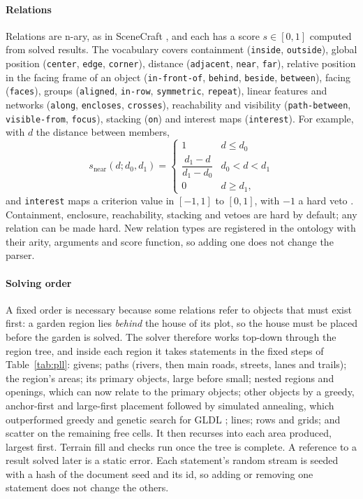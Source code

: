 \documentclass[conference]{IEEEtran}
\begin{document}
\paragraph{Relations} Relations are n-ary, as in SceneCraft \cite{scenecraft}, and each
has a score $s \in [0,1]$ computed from solved results. The vocabulary covers
containment (\texttt{inside}, \texttt{outside}), global position (\texttt{center},
\texttt{edge}, \texttt{corner}), distance (\texttt{adjacent}, \texttt{near},
\texttt{far}), relative position in the facing frame of an object
(\texttt{in-front-of}, \texttt{behind}, \texttt{beside}, \texttt{between}), facing
(\texttt{faces}), groups (\texttt{aligned}, \texttt{in-row}, \texttt{symmetric},
\texttt{repeat}), linear features and networks (\texttt{along}, \texttt{encloses},
\texttt{crosses}), reachability and visibility (\texttt{path-between},
\texttt{visible-from}, \texttt{focus}), stacking (\texttt{on}) and interest maps
(\texttt{interest}). For example, with $d$ the distance between members,
\begin{equation}
s_{\text{near}}(d; d_0, d_1) =
\begin{cases} 1 & d \le d_0 \\ \dfrac{d_1 - d}{d_1 - d_0} & d_0 < d < d_1 \\ 0 & d \ge d_1, \end{cases}
\end{equation}
and \texttt{interest} maps a criterion value in $[-1,1]$ to $[0,1]$, with $-1$ a hard
veto \cite{emilien2012}. Containment, enclosure, reachability, stacking and vetoes are
hard by default; any relation can be made hard. New relation types are registered in the
ontology with their arity, arguments and score function, so adding one does not change
the parser.

\paragraph{Solving order} A fixed order is necessary because some relations refer to
objects that must exist first: a garden region lies \emph{behind} the house of its plot,
so the house must be placed before the garden is solved. The solver therefore works
top-down through the region tree, and inside each region it takes statements in the
fixed steps of Table~\ref{tab:pll}: givens; paths (rivers, then main roads, streets,
lanes and trails); the region's areas; its primary objects, large before small; nested
regions and openings, which can now relate to the primary objects; other objects by a
greedy, anchor-first and large-first placement \cite{holodeck} followed by simulated
annealing, which outperformed greedy and genetic search for GLDL \cite{gldl}; lines;
rows and grids; and scatter on the remaining free cells. It then recurses into each area
produced, largest first. Terrain fill and checks run once the tree is complete. A
reference to a result solved later is a static error. Each statement's random stream is
seeded with a hash of the document seed and its id, so adding or removing one statement
does not change the others.
\end{document}
